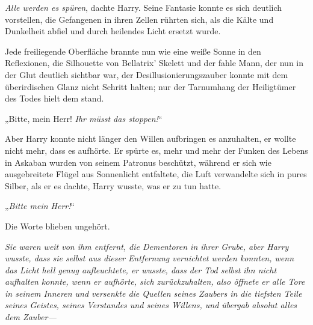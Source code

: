\emph{Alle werden es spüren}, dachte Harry. Seine Fantasie konnte es sich deutlich vorstellen, die Gefangenen in ihren Zellen rührten sich, als die Kälte und Dunkelheit abfiel und durch heilendes Licht ersetzt wurde.

Jede freiliegende Oberfläche brannte nun wie eine weiße Sonne in den Reflexionen, die Silhouette von Bellatrix’ Skelett und der fahle Mann, der nun in der Glut deutlich sichtbar war, der Desillusionierungszauber konnte mit dem überirdischen Glanz nicht Schritt halten; nur der Tarnumhang der Heiligtümer des Todes hielt dem stand.

„Bitte, mein Herr! \emph{Ihr müsst das stoppen!}“

Aber Harry konnte nicht länger den Willen aufbringen es anzuhalten, er wollte nicht mehr, dass es aufhörte. Er spürte es, mehr und mehr der Funken des Lebens in Askaban wurden von seinem Patronus beschützt, während er sich wie ausgebreitete Flügel aus Sonnenlicht entfaltete, die Luft verwandelte sich in pures Silber, als er es dachte, Harry wusste, was er zu tun hatte.

„\emph{Bitte mein Herr!}“

Die Worte blieben ungehört.

\emph{Sie waren weit von ihm entfernt, die Dementoren in ihrer Grube, aber Harry wusste, dass sie selbst aus dieser Entfernung vernichtet werden konnten, wenn das Licht hell genug aufleuchtete, er wusste, dass der Tod selbst ihn nicht aufhalten konnte, wenn er aufhörte, sich zurückzuhalten, also öffnete er alle Tore in seinem Inneren und versenkte die Quellen seines Zaubers in die tiefsten Teile seines Geistes, seines Verstandes und seines Willens, und übergab absolut alles dem Zauber—}


